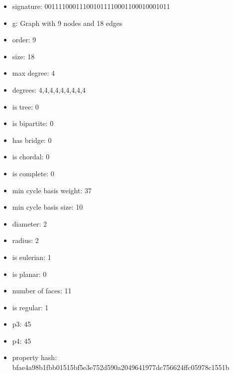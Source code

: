 \newpage
\begin{figure}
\end{figure}
\begin{itemize}
\item signature: 001111000111001011110001100010001011
\item g: Graph with 9 nodes and 18 edges
\item order: 9
\item size: 18
\item max degree: 4
\item degrees: 4,4,4,4,4,4,4,4,4
\item is tree: 0
\item is bipartite: 0
\item has bridge: 0
\item is chordal: 0
\item is complete: 0
\item min cycle basis weight: 37
\item min cycle basis size: 10
\item diameter: 2
\item radius: 2
\item is eulerian: 1
\item is planar: 0
\item number of faces: 11
\item is regular: 1
\item p3: 45
\item p4: 45
\item property hash: bfae4a98b1fbb01515bf5e3e752d590a2049641977dc756624ffc05978c1551b
\end{itemize}
